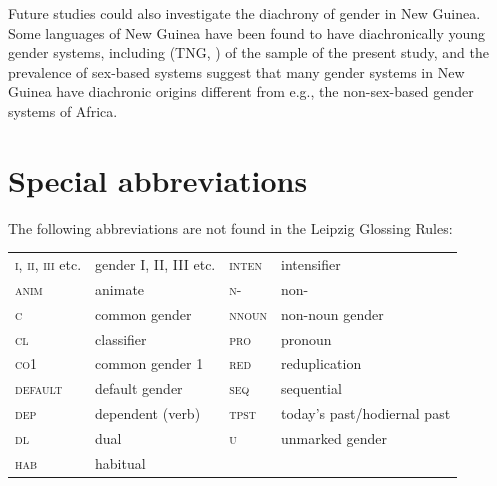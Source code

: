 \documentclass[output=collectionpaper]{langsci/langscibook}
\begin{document}
Future studies could also investigate the diachrony of gender in New Guinea. Some languages of New Guinea have been found to have diachronically young gender systems, including  (TNG, ) of the sample of the present study, and the prevalence of sex-based systems suggest that many gender systems in New Guinea have diachronic origins different from e.g., the non-sex-based gender systems of Africa.


\section*{Special abbreviations}

\noindent The following abbreviations are not found in the Leipzig Glossing Rules:
\medskip

\begin{tabular}{llll}
  \textsc{i, ii, iii} etc.	&	gender I, II, III etc.	&	\textsc{inten}	&	intensifier	\\
  \textsc{anim}	&	animate	&	\textsc{n-}	&	non-	\\
  \textsc{c}	&	common gender	&	\textsc{nnoun}	&	non-noun gender	\\
  \textsc{cl}	&	classifier	&	\textsc{pro}	&	pronoun	\\
  \textsc{co1}	&	common gender 1	&	\textsc{red}	&	reduplication	\\
  \textsc{default}	&	default gender	&	\textsc{seq}	&	sequential	\\
  \textsc{dep}	&	dependent (verb)	&	\textsc{tpst}	&	today's past/hodiernal past	\\
  \textsc{dl}	&	dual	&	\textsc{u}	&	unmarked gender	\\
  \textsc{hab}	&	habitual	&		&		\\
\end{tabular}

\sloppy
\printbibliography[heading=subbibliography,notkeyword=this]
\end{document}
